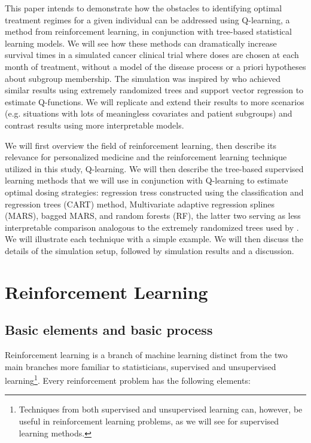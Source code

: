 \documentclass[12pt]{article}
\begin{document}
This paper intends to demonstrate how the obstacles to identifying optimal treatment regimes for a given individual can be addressed using Q-learning, a method from reinforcement learning, in conjunction with tree-based statistical learning models. We will see how these methods can dramatically increase survival times in a simulated cancer clinical trial where doses are chosen at each month of treatment, without a model of the disease process or a priori hypotheses about subgroup membership. The simulation was inspired by \textcite{crt} who achieved similar results using extremely randomized trees and support vector regression to estimate Q-functions. We will replicate and extend their results to more scenarios (e.g. situations with lots of meaningless covariates and patient subgroups) and contrast results using more interpretable models.

We will first overview the field of reinforcement learning, then describe its relevance for personalized medicine and the reinforcement learning technique utilized in this study, Q-learning. We will then describe the tree-based supervised learning methods that we will use in conjunction with Q-learning to estimate optimal dosing strategies: regression tress constructed using the classification and regression trees (CART) method, Multivariate adaptive regression splines (MARS), bagged MARS, and random forests (RF), the latter two serving as less interpretable comparison analogous to the extremely randomized trees used by \textcite{crt}. We will illustrate each technique with a simple example. We will then discuss the details of the simulation setup, followed by simulation results and a discussion.


\section{Reinforcement Learning} %
\label{sec:reinforcement_learning}

\subsection{Basic elements and basic process} %
\label{sub:basic_process}

Reinforcement learning is a branch of machine learning distinct from the two main branches more familiar to statisticians, supervised and unsupervised learning\footnote{Techniques from both supervised and unsupervised learning can, however, be useful in reinforcement learning problems, as we will see for supervised learning methods.}. Every reinforcement problem has the following elements:
\end{document}
